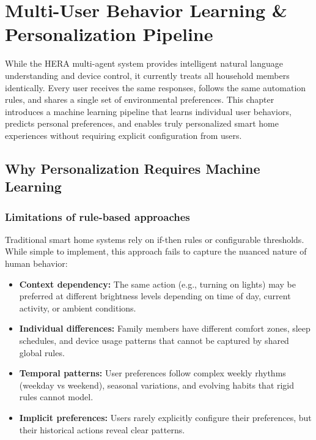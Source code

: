 \newpage
\section{Multi-User Behavior Learning \& Personalization Pipeline}
\label{sec:personalization}

While the HERA multi-agent system provides intelligent natural language
understanding and device control, it currently treats all household
members identically. Every user receives the same responses, follows the
same automation rules, and shares a single set of environmental
preferences. This chapter introduces a machine learning pipeline that
learns individual user behaviors, predicts personal preferences, and
enables truly personalized smart home experiences without requiring
explicit configuration from users.

\subsection{Why Personalization Requires Machine Learning}

\subsubsection{Limitations of rule-based approaches}

Traditional smart home systems rely on if-then rules or configurable
thresholds. While simple to implement, this approach fails to capture
the nuanced nature of human behavior:
\begin{itemize}
    \item \textbf{Context dependency:} The same action (e.g., turning on
    lights) may be preferred at different brightness levels depending on
    time of day, current activity, or ambient conditions.
    \item \textbf{Individual differences:} Family members have different
    comfort zones, sleep schedules, and device usage patterns that cannot
    be captured by shared global rules.
    \item \textbf{Temporal patterns:} User preferences follow complex
    weekly rhythms (weekday vs weekend), seasonal variations, and evolving
    habits that rigid rules cannot model.
    \item \textbf{Implicit preferences:} Users rarely explicitly configure
    their preferences, but their historical actions reveal clear patterns.
\end{itemize}

